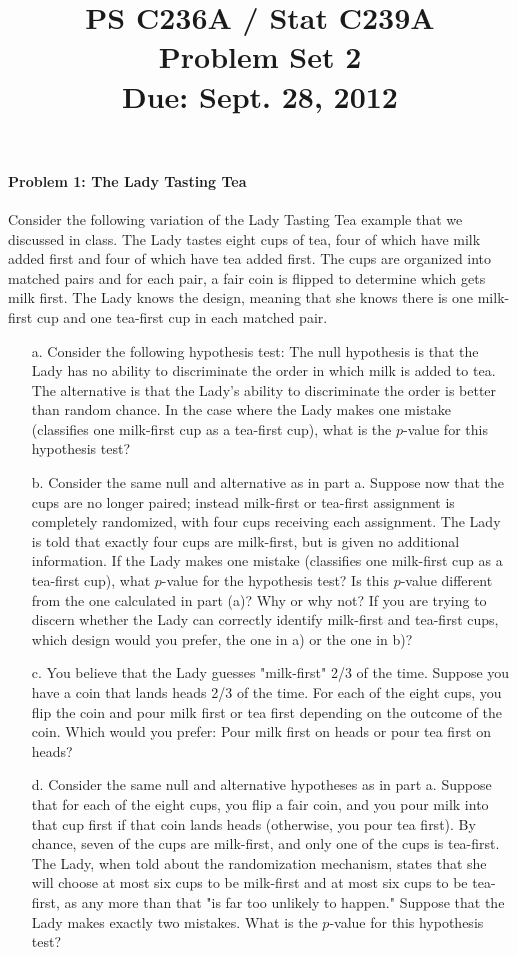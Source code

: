 \documentclass{article}
\title{PS C236A / Stat C239A \\ Problem Set 2 \\ Due: Sept. 28, 2012}
\date{}
\begin{document}
\paragraph{Problem 1: The Lady Tasting Tea }
Consider the following variation of the Lady Tasting Tea example that we discussed in class. The Lady tastes eight cups of tea, four of which have milk added first and four of which have tea added first. The cups are organized into matched pairs and for each pair, a fair coin is flipped to determine which gets milk first. The Lady knows the design, meaning that she knows there is one milk-first cup and one tea-first cup in each matched pair.

\begin{itemize}


\item[a.]   Consider the following hypothesis test:  The null hypothesis 
  is that the Lady has no ability to
  discriminate the order in which milk is added to tea. 
  The alternative is that the Lady's ability to discriminate 
  the order is better than random chance.
  In the case where the Lady makes one mistake (classifies
  one milk-first cup as a tea-first cup), what is the $p$-value for this hypothesis test?

\item[b.] Consider the same null and alternative as in part a.  
  Suppose now that the cups are no longer paired;
  instead milk-first or tea-first assignment is completely randomized,
  with four cups receiving each assignment. 
  The Lady is told that exactly four cups are milk-first, 
  but is given no additional information.
  If the Lady makes one mistake (classifies one milk-first cup as a tea-first cup), 
  what $p$-value for the hypothesis test?
  Is this $p$-value different from the one calculated in part (a)? 
  Why or why not?
  If you are trying to discern whether the 
  Lady can correctly identify milk-first
  and tea-first cups, which design would you prefer,
  the one in a) or the one in b)?

\item[c.]  You believe that the Lady guesses "milk-first" 2/3 of the time.  
  Suppose you have a coin that
  lands heads 2/3 of the time.  
  For each of the eight cups, you flip the coin and pour
  milk first or tea first depending on the outcome of the coin.
  Which would you prefer:  
  Pour milk first on heads or pour tea first on heads?
  
\item[d.]  
  Consider the same null and alternative hypotheses as in part a.
  Suppose that for each of the eight cups, you flip a fair coin, 
  and you pour milk into that cup first
  if that coin lands heads (otherwise, you pour tea first).
  By chance, seven of the cups are milk-first, and only one of the cups is tea-first.
  The Lady, when told about the randomization mechanism, 
  states that she will choose at most six cups to be milk-first and at most six cups to 
  be tea-first, as any more than that "is far too unlikely to happen."
  Suppose that the Lady makes exactly two mistakes.
  What is the $p$-value for this hypothesis test?

\end{itemize}
\end{document}
